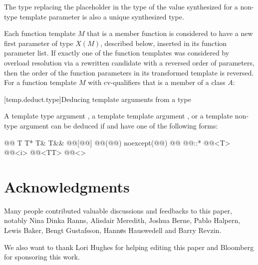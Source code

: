 \documentclass{wg21}
\begin{document}
\begin{note}
    The type replacing the placeholder
    in the type of the value synthesized for a non-type template parameter
    is also a unique synthesized type.
\end{note}
Each function template $M$ that is a member function
is considered to have
a new first parameter of type $X(M)$, described below,
inserted in its function parameter list.
If exactly one of the function templates was considered by overload resolution
via a rewritten candidate 
with a reversed order of parameters,
then the order of the function parameters in its transformed template
is reversed.
For a function template $M$ with cv-qualifiers \cv{}
that is a member of a class $A$:


[temp.deduct.type]{Deducing template arguments from a type}


\pnum
A template type argument
,
a template template argument 
,
or a template non-type argument
can be deduced if
and
have one of the following forms:
\begin{codeblock}
    @\opt{\cv{}}@ T
    T*
    T&
    T&&
    @@[@@]
    @@(@@) noexcept(@@)
    @@ @@::*
    @@<T>
    @@<i>
    @@<TT>
    @@<>
\end{codeblock}


\section{Acknowledgments}
Many people contributed valuable discussions and feedbacks to this paper, notably
Nina Dinka Ranns, Alisdair Meredith, Joshua Berne, Pablo Halpern, Lewis Baker, Bengt Gustafsson,
Hannеs Hauswedell and Barry Revzin.

We also want to thank Lori Hughes for helping editing this paper and Bloomberg for sponsoring this work.






\renewcommand{\section}[2]{}%

\begin{thebibliography}{9}


\end{thebibliography}
\end{document}
